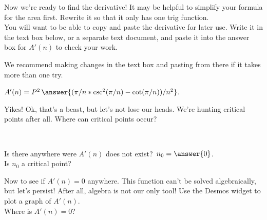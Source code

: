 \documentclass[handout,nooutcomes]{ximera}
\begin{document}
\bigskip

\hspace{2cm}Now we're ready to find the derivative! It may be helpful to simplify your formula for the area first. Rewrite it so that it only has one trig function.\\
You will want to be able to copy and paste the derivative for later use. Write it in the text box below, or a separate text document, and paste it into the answer box for $A'(n)$ to check your work.\\

\begin{freeResponse}
We recommend making changes in the text box and pasting from there if it takes more than one try.
\end{freeResponse}
$A'(n) = P^2\,\answer{(\pi/n*\csc^2(\pi/n)-\cot(\pi/n))/n^2}$.\\

\bigskip

\hspace{2cm}Yikes! Ok, that's a beast, but let's not lose our heads. We're hunting critical points after all. Where can critical points occur?
\begin{selectAll}
\end{selectAll}\\

\bigskip

Is there anywhere were $A'(n)$ does not exist? $\,n_0 = \answer{0}$.\\
Is $n_0$ a critical point?\\
\begin{multipleChoice}
\end{multipleChoice}

\bigskip

\hspace{2cm}Now to see if $A'(n)=0$ anywhere. This function can't be solved algebraically, but let's persist! After all, algebra is not our only tool! Use the Desmos widget to plot a graph of $A'(n)$.\\
Where is $A'(n)=0$?\\
\begin{multipleChoice}
\end{multipleChoice}
\end{document}
